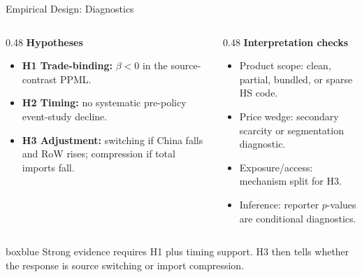 \documentclass[aspectratio=169,11pt]{beamer}
\newcommand{\tightitem}{\setlength\itemsep{0.25em}}
\newcommand{\plainbox}[2]{%
  \begin{beamercolorbox}[rounded=true,sep=0.48em,wd=\textwidth]{#1}
    #2
  \end{beamercolorbox}
}
\begin{document}
\begin{frame}{Empirical Design: Diagnostics}
  \small
  \begin{columns}[T,totalwidth=\textwidth]
    \begin{column}{0.48\textwidth}
      \textbf{Hypotheses}
      \begin{itemize}
        \tightitem
        \item \textbf{H1 Trade-binding:} \(\beta<0\) in the source-contrast PPML.
        \item \textbf{H2 Timing:} no systematic pre-policy event-study decline.
        \item \textbf{H3 Adjustment:} switching if China falls and RoW rises; compression if total imports fall.
      \end{itemize}
    \end{column}
    \begin{column}{0.48\textwidth}
      \textbf{Interpretation checks}
      \begin{itemize}
        \tightitem
        \item Product scope: clean, partial, bundled, or sparse HS code.
        \item Price wedge: secondary scarcity or segmentation diagnostic.
        \item Exposure/access: mechanism split for H3.
        \item Inference: reporter \(p\)-values are conditional diagnostics.
      \end{itemize}
    \end{column}
  \end{columns}

  \vspace{0.16cm}
  \plainbox{boxblue}{%
    \small Strong evidence requires H1 plus timing support. H3 then tells whether the response is source switching or import compression.
  }
\end{frame}
\end{document}
